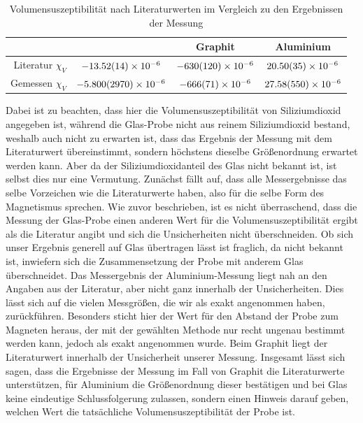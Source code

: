\documentclass[
	a4paper,
	12pt,
	pagesize,
	ngerman
]{scrartcl}
\begin{document}
	\begin{table}[h]
		\centering
	\begin{tabular}{ r | c | c | c |}
		& \ce{SiO2} & Graphit & Aluminium \\ \hline
		Literatur $\chi_V $ & $\SI{-13,52 \pm 0,14 e-6}{}$ & $\SI{-630 \pm 120 e-6}{}$ & $\SI{20,50 \pm 0,35 e-6}{}$\\
		Gemessen  $\chi_V $ & $\SI{-5,800 \pm 2.97 e-6}{}$&$\SI{-666 \pm 71 e-6}{}$&$\SI{27,58 \pm 5.5e-6}{}$\\ \hline 
	\end{tabular} 
	\caption{Volumensuszeptibilität nach Literaturwerten im Vergleich zu den Ergebnissen der Messung}
	\end{table}
	Dabei ist zu beachten, dass hier die Volumensuszeptibilität von Siliziumdioxid angegeben ist, während die Glas-Probe nicht aus reinem Siliziumdioxid bestand, weshalb auch nicht zu erwarten ist, dass das Ergebnis der Messung mit dem Literaturwert übereinstimmt, sondern höchstens dieselbe Größenordnung erwartet werden kann. Aber da der Siliziumdioxidanteil des Glas nicht bekannt ist, ist selbst dies nur eine Vermutung.  \newline
	Zunächst fällt auf, dass alle Messergebnisse das selbe Vorzeichen wie die Literaturwerte haben, also für die selbe Form des Magnetismus sprechen.\newline 
	Wie zuvor beschrieben, ist es nicht überraschend, dass die Messung der Glas-Probe einen anderen Wert für die Volumensuszeptibilität ergibt als die Literatur angibt und sich die Unsicherheiten nicht überschneiden. Ob sich unser Ergebnis generell auf Glas übertragen lässt ist fraglich, da nicht bekannt ist, inwiefern sich die Zusammensetzung der Probe mit anderem Glas überschneidet. Das Messergebnis der Aluminium-Messung liegt nah an den Angaben aus der Literatur, aber nicht ganz innerhalb der Unsicherheiten. Dies lässt sich auf die vielen Messgrößen, die wir als exakt angenommen haben, zurückführen. Besonders sticht hier der Wert für den Abstand der Probe zum Magneten heraus, der mit der gewählten Methode nur recht ungenau bestimmt werden kann, jedoch als exakt angenommen wurde. %
	Beim Graphit liegt der Literaturwert innerhalb der Unsicherheit unserer Messung. \newline
	Insgesamt lässt sich sagen, dass die Ergebnisse der Messung im Fall von Graphit die Literaturwerte unterstützen, für Aluminium die Größenordnung dieser bestätigen und bei Glas keine eindeutige Schlussfolgerung zulassen, sondern einen Hinweis darauf geben, welchen Wert die tatsächliche Volumensuszeptibilität der Probe ist.
	
\end{document}
